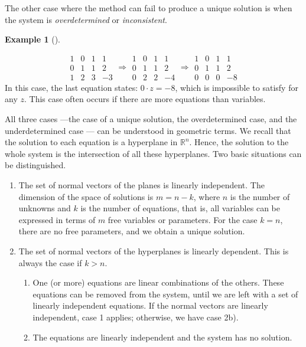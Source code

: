 \documentclass[
  a4paper,
  DIV=11,
  numbers=noendperiod,
  oneside]{scrreprt}
\theoremstyle{definition}
\newtheorem{example}{Example}[chapter]
\theoremstyle{remark}
\begin{document}
The other case where the method can fail to produce a unique solution is
when the system is \emph{overdetermined} or \emph{inconsistent}.

\begin{example}[]\protect\hypertarget{exm-ge3}{}\label{exm-ge3}

\[\begin{array}{rrr|r}
  1 & 0& 1 &1 \\
   0& 1 & 1  & 2 \\
    1 & 2 & 3 & -3    
\end{array}
\Rightarrow
\begin{array}{rrr|r}
  1 & 0& 1 &1 \\
   0& 1 & 1  & 2 \\
    0 & 2 & 2 & -4    
\end{array}
\Rightarrow
\begin{array}{rrr|r}
  1 & 0& 1 &1 \\
   0& 1 & 1  & 2 \\
    0 & 0 & 0 & -8    
\end{array}\] In this case, the last equation states: \(0\cdot z=-8\),
which is impossible to satisfy for any \(z\). This case often occurs if
there are more equations than variables.

\end{example}

All three cases ---the case of a unique solution, the overdetermined
case, and the underdetermined case --- can be understood in geometric
terms. We recall that the solution to each equation is a hyperplane in
\(\mathbb{R}^{n}\). Hence, the solution to the whole system is the
intersection of all these hyperplanes. Two basic situations can be
distinguished.

\begin{enumerate}
\def\labelenumi{\arabic{enumi}.}
\item
  The set of normal vectors of the planes is linearly independent. The
  dimension of the space of solutions is \(m=n-k\), where \(n\) is the
  number of unknowns and \(k\) is the number of equations, that is, all
  variables can be expressed in terms of \(m\) free variables or
  parameters. For the case \(k=n\), there are no free parameters, and we
  obtain a unique solution.
\item
  The set of normal vectors of the hyperplanes is linearly dependent.
  This is always the case if \(k>n\).

  \begin{enumerate}
  \def\labelenumii{\arabic{enumii}.}
  \item
    One (or more) equations are linear combinations of the others. These
    equations can be removed from the system, until we are left with a
    set of linearly independent equations. If the normal vectors are
    linearly independent, case 1 applies; otherwise, we have case 2b).
  \item
    The equations are linearly independent and the system has no
    solution.
  \end{enumerate}
\end{enumerate}
\end{document}
